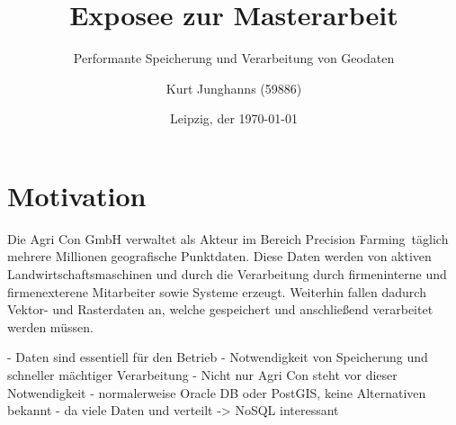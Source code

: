 \documentclass[
a4paper,     %
12pt         %
]{scrartcl}  %
\title{Exposee zur Masterarbeit}
\subtitle{Performante Speicherung und Verarbeitung von Geodaten}
\author{Kurt Junghanns (59886)}
\date{Leipzig, der \today{}}
\begin{document}

 \maketitle

 \tableofcontents







\section{Motivation}

Die Agri Con GmbH verwaltet als Akteur im Bereich \glqq Precision Farming\grqq \ täglich mehrere Millionen geografische Punktdaten.
Diese Daten werden von aktiven Landwirtschaftsmaschinen und durch die Verarbeitung durch firmeninterne und firmenexterene Mitarbeiter sowie Systeme erzeugt.
Weiterhin fallen dadurch Vektor- und Rasterdaten an, welche gespeichert und anschließend verarbeitet werden müssen.

- Daten sind essentiell für den Betrieb
- Notwendigkeit von Speicherung und schneller mächtiger Verarbeitung
- Nicht nur Agri Con steht vor dieser Notwendigkeit
- normalerweise Oracle DB oder PostGIS, keine Alternativen bekannt
- da viele Daten und verteilt -> NoSQL interessant
\end{document}
